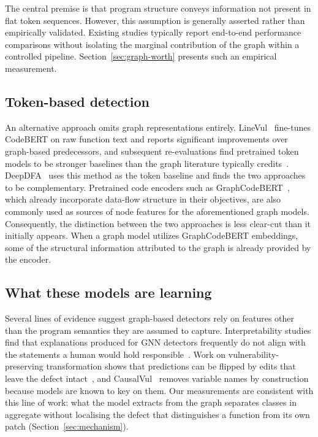The central premise is that program structure conveys information not present in flat token sequences. However, this assumption is generally asserted rather than empirically validated. Existing studies typically report end-to-end performance comparisons without isolating the marginal contribution of the graph within a controlled pipeline. Section~\ref{sec:graph-worth} presents such an empirical measurement.

\subsection{Token-based detection}
An alternative approach omits graph representations entirely. LineVul~\citep{fu2022linevul} fine-tunes CodeBERT on raw function text and reports significant improvements over graph-based predecessors, and subsequent re-evaluations find pretrained token models to be stronger baselines than the graph literature typically credits~\citep{li2025revisitingpretrainedlanguagemodels}. DeepDFA~\citep{steenhoek2023dataflowanalysisinspireddeeplearning} uses this method as the token baseline and finds the two approaches to be complementary. Pretrained code encoders such as GraphCodeBERT~\citep{guo2021graphcodebertpretrainingcoderepresentations}, which already incorporate data-flow structure in their objectives, are also commonly used as sources of node features for the aforementioned graph models. Consequently, the distinction between the two approaches is less clear-cut than it initially appears. When a graph model utilizes GraphCodeBERT embeddings, some of the structural information attributed to the graph is already provided by the encoder.


\subsection{What these models are learning}
Several lines of evidence suggest graph-based detectors rely on features other
than the program semantics they are assumed to capture. Interpretability studies
find that explanations produced for GNN detectors frequently do not align with
the statements a human would hold responsible~\citep{10.1145/3597926.3598145}.
Work on vulnerability-preserving transformation shows that predictions can be
flipped by edits that leave the defect
intact~\citep{10.1145/3652032.3657564}, and CausalVul~\citep{rahman2024causal}
removes variable names by construction because models are known to key on them.
Our measurements are consistent with this line of work: what the model extracts
from the graph separates classes in aggregate without localising the defect that
distinguishes a function from its own patch (Section~\ref{sec:mechanism}).

